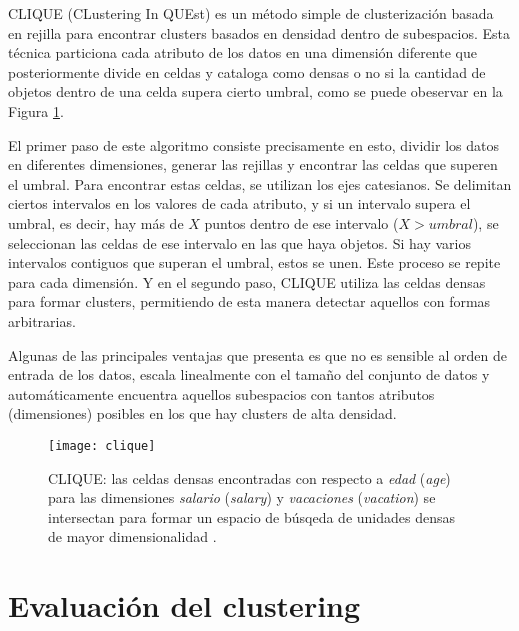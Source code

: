 \documentclass[10pt, a4paper]{article}
\begin{document}
  CLIQUE (CLustering In QUEst) es un método simple de clusterización basada en rejilla para encontrar clusters basados en densidad dentro de subespacios. Esta técnica particiona cada atributo de los datos en una dimensión diferente que posteriormente divide en celdas y cataloga como densas o no si la cantidad de objetos dentro de una celda supera cierto umbral, como se puede obeservar en la Figura \ref{fig:clique}.

El primer paso de este algoritmo consiste precisamente en esto, dividir los datos en diferentes dimensiones, generar las rejillas y encontrar las celdas que superen el umbral. Para encontrar estas celdas, se utilizan los ejes catesianos. Se delimitan ciertos intervalos en los valores de cada atributo, y si un intervalo supera el umbral, es decir, hay más de $X$ puntos dentro de ese intervalo ($X > umbral$), se seleccionan las celdas de ese intervalo en las que haya objetos. Si hay varios intervalos contiguos que superan el umbral, estos se unen. Este proceso se repite para cada dimensión. Y en el segundo paso, CLIQUE utiliza las celdas densas para formar clusters, permitiendo de esta manera detectar aquellos con formas arbitrarias.

Algunas de las principales ventajas que presenta es que no es sensible al orden de entrada de los datos, escala linealmente con el tamaño del conjunto de datos y automáticamente encuentra aquellos subespacios con tantos atributos (dimensiones) posibles en los que hay clusters de alta densidad.


\begin{figure}[ht]
\centering
\texttt{[image: clique]}
\caption{CLIQUE: las celdas densas encontradas con respecto a \textit{edad} (\textit{age}) para las dimensiones \textit{salario} (\textit{salary}) y \textit{vacaciones} (\textit{vacation}) se intersectan para formar un espacio de búsqeda de unidades densas de mayor dimensionalidad \cite{LIBRO}.}
\label{fig:clique}
\end{figure}



\section{Evaluación del clustering} \label{sec:Evaluación del clustering}
\end{document}
